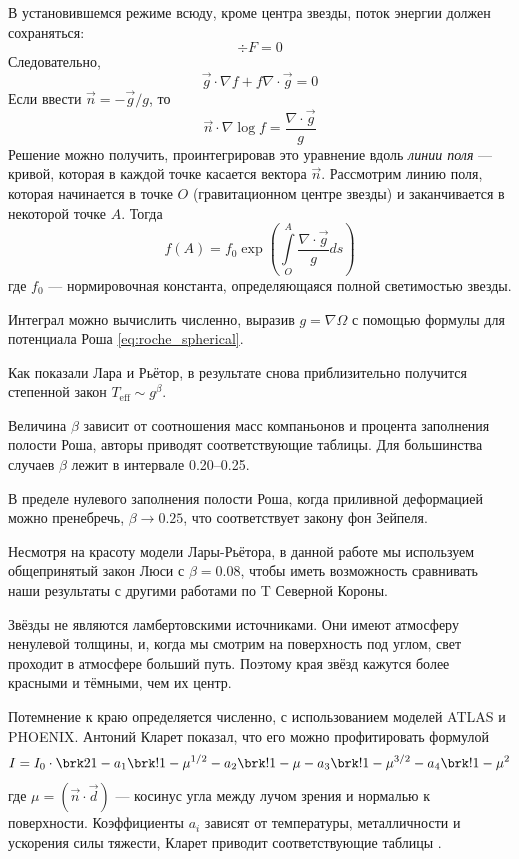 В установившемся режиме всюду, кроме центра звезды, поток энергии должен сохраняться:
\[
\div F = 0
\]
Следовательно,
\[
\vec g \cdot \nabla f + f \nabla \cdot \vec g = 0
\]
Если ввести $\vec n = -\vec g / g$, то
\[
\vec n \cdot \nabla \log f = \frac{\nabla \cdot \vec g}{g}
\]
Решение можно получить, проинтегрировав это уравнение вдоль \emph{линии поля} --- кривой, которая в каждой точке касается вектора $\vec n$. Рассмотрим линию поля, которая начинается в точке $O$ (гравитационном центре звезды) и заканчивается в некоторой точке $A$. Тогда
\begin{equation*}
f(A) = f_0 \exp \left(
    {}\int\limits_O^A \frac{\nabla \cdot \vec g}{g} ds
\right)
\label{eq:LaraSolution}
\end{equation*}
где $f_0$ --- нормировочная константа, определяющаяся полной светимостью звезды.

Интеграл можно вычислить численно, выразив $g = \nabla \Omega$ с помощью формулы для потенциала Роша \eqref{eq:roche_spherical}.

Как показали Лара и Рьётор, в результате снова приблизительно получится степенной закон $T_\text{eff} \sim g^\beta$.

Величина $\beta$ зависит от соотношения масс компаньонов и процента заполнения полости Роша, авторы приводят соответствующие таблицы. Для большинства случаев $\beta$ лежит в интервале 0.20--0.25.

В пределе нулевого заполнения полости Роша, когда приливной деформацией можно пренебречь, $\beta \to 0.25$, что соответствует закону фон Зейпеля.

Несмотря на красоту модели Лары-Рьётора, в данной работе мы используем общепринятый закон Люси с $\beta = 0.08$, чтобы иметь возможность сравнивать наши результаты с другими работами по T Северной Короны.



Звёзды не являются ламбертовскими источниками. Они имеют атмосферу ненулевой толщины, и, когда мы смотрим на поверхность под углом, свет проходит в атмосфере больший путь. Поэтому края звёзд кажутся более красными и тёмными, чем их центр.

Потемнение к краю определяется численно, с использованием моделей ATLAS и PHOENIX. Антоний Кларет показал, что его можно профитировать формулой
\begin{equation}
I = I_0 \cdot \brk2{
    1 - a_1 \brk!{1 - \mu^{1/2}} - a_2 \brk!{1 - \mu} - a_3 \brk!{1 - \mu^{3/2}} - a_4 \brk!{1 - \mu^2}
}
\label{eq:ClaretDarkening}
\end{equation}
где $\mu = (\vec n \cdot \vec d)$ --- косинус угла между лучом зрения и нормалью к поверхности. Коэффициенты $a_i$ зависят от температуры, металличности и ускорения силы тяжести, Кларет приводит соответствующие таблицы \cite{ClaretDarkening}.

